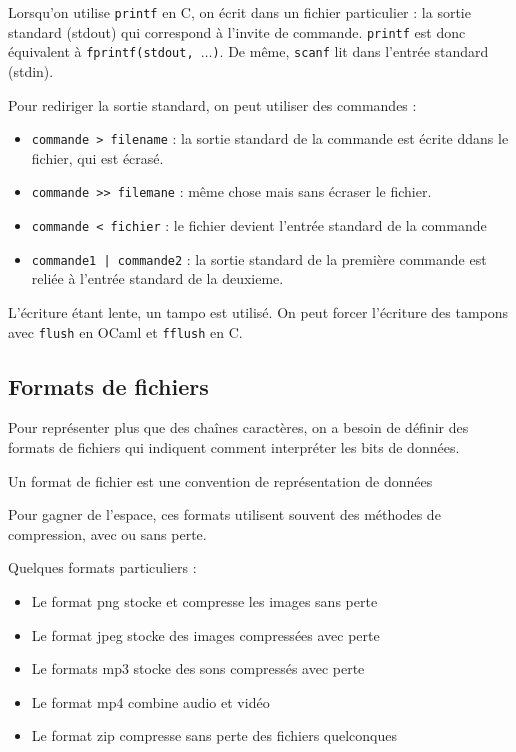 \begin{rem}
	Lorsqu'on utilise \texttt{printf} en C, on écrit dans un fichier particulier : la sortie standard (stdout) qui correspond à l'invite de commande. \texttt{printf} est donc équivalent à \texttt{fprintf(stdout, $\dots$)}. De même, \texttt{scanf} lit dans l'entrée standard (stdin). 
\end{rem}

\begin{definition}
	Pour rediriger la sortie standard, on peut utiliser des commandes : \begin{itemize}
		\item \texttt{commande > filename} : la sortie standard de la commande est écrite ddans le fichier, qui est écrasé.
		\item \texttt{commande >> filemane} : même chose mais sans écraser le fichier. 
		\item \texttt{commande < fichier} : le fichier devient l'entrée standard de la commande
		\item \texttt{commande1 | commande2} : la sortie standard de la première commande est reliée à l'entrée standard de la deuxieme.
	\end{itemize}
\end{definition}

\begin{rem}
	L'écriture étant lente, un tampo est utilisé. On peut forcer l'écriture des tampons avec \texttt{flush} en OCaml et \texttt{fflush} en C.
\end{rem}

\subsection{Formats de fichiers}

Pour représenter plus que des chaînes caractères, on a besoin de définir des formats de fichiers qui indiquent comment interpréter les bits de données. 

\begin{definition}
	Un format de fichier est une convention de représentation de données
\end{definition}

\begin{rem}
	Pour gagner de l'espace, ces formats utilisent souvent des méthodes de compression, avec ou sans perte.
\end{rem}

\begin{example}
	Quelques formats particuliers :
	\begin{itemize}
		\item Le format png stocke et compresse les images sans perte
		\item Le format jpeg stocke des images compressées avec perte
		\item Le formats mp3 stocke des sons compressés avec perte
		\item Le format mp4 combine audio et vidéo
		\item Le format zip compresse sans perte des fichiers quelconques
	\end{itemize}
\end{example}

